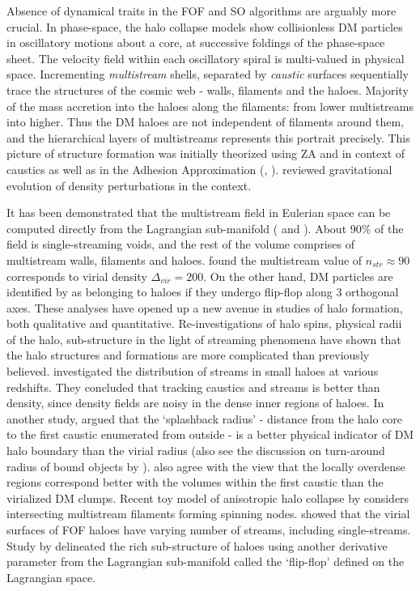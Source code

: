 \documentclass[fleqn,usenatbib,useAMS]{mnras}
\begin{document}
Absence of dynamical traits in the FOF and SO algorithms are arguably more crucial. In phase-space, the halo collapse models show collisionless DM particles in oscillatory motions about a core, at successive foldings of the phase-space sheet. The velocity field within each oscillatory spiral is multi-valued in physical space. Incrementing {\it multistream} shells, separated by {\it caustic} surfaces sequentially trace the structures of the cosmic web - walls, filaments and the haloes. Majority of the mass accretion into the haloes along the filaments: from lower multistreams into higher. Thus the DM haloes are not independent of filaments around them, and the hierarchical layers of multistreams represents this portrait precisely. This picture of structure formation was initially theorized using ZA \cite{Zeldovich1970} and in context of caustics \cite{Arnold1982} as well as in the Adhesion Approximation (\citealt{Gurbatov1989}, \citealt{Kofman1992}). 
\cite{Shandarin1989} reviewed gravitational evolution of density perturbations in the context.  

It has been demonstrated that the multistream field in Eulerian space can be computed directly from the Lagrangian sub-manifold (\citealt{Shandarin2012} and \citealt{Abel2012}). About 90\% of the field is single-streaming voids, and the rest of the volume comprises of multistream walls, filaments and haloes. \cite{Ramachandra2015} found the multistream value of $n_{str} \approx 90$ corresponds to virial density $\Delta_{vir} = 200$. On the other hand, DM particles are identified by \citep{Falck2012} as belonging to haloes if they undergo flip-flop along 3 orthogonal axes. These analyses have opened up a new avenue in studies of halo formation, both qualitative and quantitative. Re-investigations of halo spins, physical radii of the halo, sub-structure in the light of streaming phenomena have shown that the halo structures and formations are more complicated than previously believed. \cite{Vogelsberger2011} investigated the distribution of streams in small haloes at various redshifts. They concluded that tracking caustics and streams is better than density, since density fields are noisy in the dense inner regions of haloes. In another study, \cite{More2015} argued that the `splashback radius' - distance from the halo core to the first caustic enumerated from outside - is a better physical indicator of DM halo boundary than the virial radius (also see the discussion on turn-around radius of bound objects by \citealt{Lee2016a}). \cite{Angulo2013a} also agree with the view that the locally overdense regions correspond better with the volumes within the first caustic than the virialized DM clumps. Recent toy model of anisotropic halo collapse by \cite{Neyrinck2016} considers intersecting multistream filaments forming spinning nodes. \cite{Ramachandra2017} showed that the virial surfaces of FOF haloes have varying number of streams, including single-streams. Study by \cite{Shandarin2016} delineated the rich sub-structure of haloes using another derivative parameter from the Lagrangian sub-manifold called the `flip-flop' defined on the Lagrangian space. 
\end{document}
